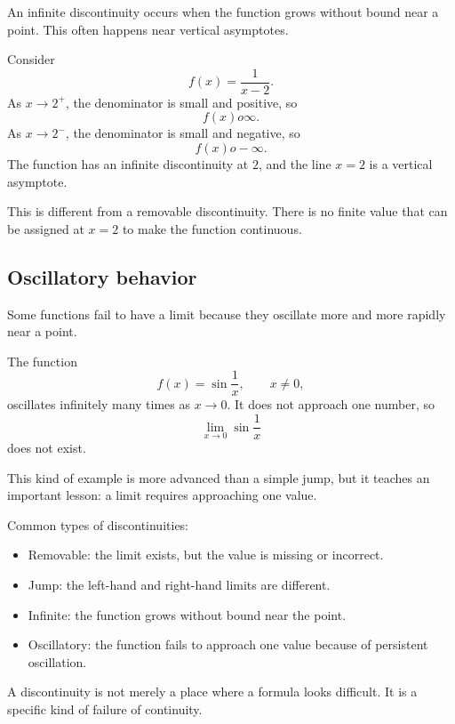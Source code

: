 An infinite discontinuity occurs when the function grows without bound near a point. This often happens near vertical asymptotes.

\begin{examplebox}
Consider
\[
f(x)=\frac1{x-2}.
\]
As \(x\to2^+\), the denominator is small and positive, so
\[
f(x)	o\infty.
\]
As \(x\to2^-\), the denominator is small and negative, so
\[
f(x)	o-\infty.
\]
The function has an infinite discontinuity at \(2\), and the line \(x=2\) is a vertical asymptote.
\end{examplebox}

This is different from a removable discontinuity. There is no finite value that can be assigned at \(x=2\) to make the function continuous.

\subsection*{Oscillatory behavior}

Some functions fail to have a limit because they oscillate more and more rapidly near a point.

\begin{examplebox}
The function
\[
f(x)=\sin\frac1x,
\qquad x\ne0,
\]
oscillates infinitely many times as \(x\to0\). It does not approach one number, so
\[
\lim_{x\to0}\sin\frac1x
\]
does not exist.
\end{examplebox}

This kind of example is more advanced than a simple jump, but it teaches an important lesson: a limit requires approaching one value.

\begin{summarybox}
Common types of discontinuities:
\begin{itemize}
\item Removable: the limit exists, but the value is missing or incorrect.
\item Jump: the left-hand and right-hand limits are different.
\item Infinite: the function grows without bound near the point.
\item Oscillatory: the function fails to approach one value because of persistent oscillation.
\end{itemize}
\end{summarybox}

A discontinuity is not merely a place where a formula looks difficult. It is a specific kind of failure of continuity.